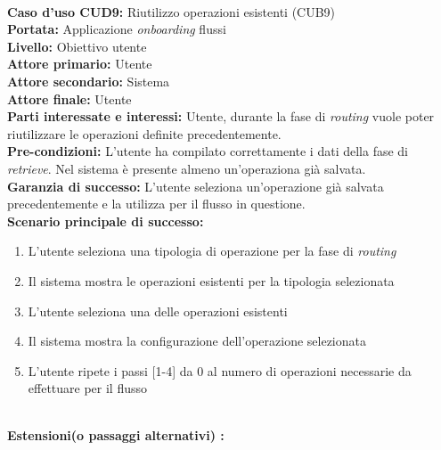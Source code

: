 \label{subsec:cu9}
\ \\
\textbf{Caso d’uso CUD9:} Riutilizzo operazioni esistenti (CUB9) \\
\textbf{Portata:} Applicazione \textit{onboarding} flussi\\
\textbf{Livello:} Obiettivo utente \\
\textbf{Attore primario:} Utente\\
\textbf{Attore secondario:} Sistema \\
\textbf{Attore finale:} Utente \\
\textbf{Parti interessate e interessi:} 
Utente, durante la fase di \textit{routing} vuole poter riutilizzare le operazioni definite precedentemente. \\
\textbf{Pre-condizioni:} L’utente ha compilato correttamente i dati della fase di \textit{retrieve}. Nel sistema è presente almeno un'operaziona già salvata. \\
\textbf{Garanzia di successo:} L'utente seleziona un'operazione già salvata precedentemente e la utilizza per il flusso in questione.\\
\textbf{Scenario principale di successo:} 
\begin{enumerate}
  \item L'utente seleziona una tipologia di operazione per la fase di \textit{routing}
  \item Il sistema mostra le operazioni esistenti per la tipologia selezionata
  \item L'utente seleziona una delle operazioni esistenti
  \item Il sistema mostra la configurazione dell'operazione selezionata
  \item L'utente ripete i passi [1-4] da 0 al numero di operazioni necessarie da effettuare per il flusso
\end{enumerate} 
\  \\
\textbf{Estensioni(o passaggi alternativi) :}
